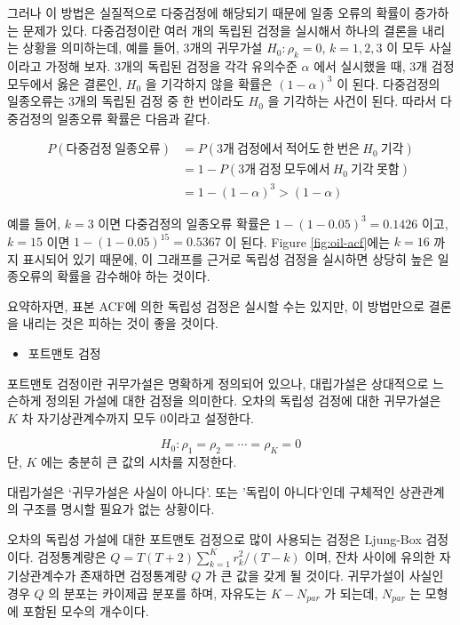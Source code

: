 \documentclass[
]{book}
\providecommand{\tightlist}{%
  \setlength{\itemsep}{0pt}\setlength{\parskip}{0pt}}
\begin{document}
그러나 이 방법은 실질적으로 다중검정에 해당되기 때문에 일종 오류의 확률이 증가하는 문제가 있다.
다중검정이란 여러 개의 독립된 검정을 실시해서 하나의 결론을 내리는 상황을 의미하는데,
예를 들어, 3개의 귀무가설 \(H_{0}: \rho_{k} = 0\), \(k=1, 2, 3\) 이 모두 사실이라고 가정해 보자.
3개의 독립된 검정을 각각 유의수준 \(\alpha\) 에서 실시했을 때,
3개 검정 모두에서 옳은 결론인, \(H_{0}\) 을 기각하지 않을 확률은 \((1-\alpha)^{3}\) 이 된다.
다중검정의 일종오류는 3개의 독립된 검정 중 한 번이라도 \(H_{0}\) 을 기각하는 사건이 된다.
따라서 다중검정의 일종오류 확률은 다음과 같다.

\begin{align*}
P(다중검정~일종오류) &= P(3개~검정에서~적어도~한~번은~H_{0}~기각) \\
                     &= 1-P(3개~검정~모두에서~H_{0}~기각~못함) \\
                     &= 1-(1-\alpha)^{3} > (1-\alpha) 
\end{align*}

예를 들어, \(k=3\) 이면 다중검정의 일종오류 확률은 \(1-(1-0.05)^{3} = 0.1426\) 이고,
\(k=15\) 이면 \(1-(1-0.05)^{15} = 0.5367\) 이 된다.
Figure \ref{fig:oil-acf}에는 \(k=16\) 까지 표시되어 있기 때문에,
이 그래프를 근거로 독립성 검정을 실시하면 상당히 높은 일종오류의 확률을 감수해야 하는 것이다.

요약하자면, 표본 ACF에 의한 독립성 검정은 실시할 수는 있지만,
이 방법만으로 결론을 내리는 것은 피하는 것이 좋을 것이다.

\begin{itemize}
\tightlist
\item
  포트맨토 검정
\end{itemize}

포트맨토 검정이란 귀무가설은 명확하게 정의되어 있으나,
대립가설은 상대적으로 느슨하게 정의된 가설에 대한 검정을 의미한다.
오차의 독립성 검정에 대한 귀무가설은 \(K\) 차 자기상관계수까지 모두 0이라고 설정한다.

\[
H_{0}: \rho_{1}=\rho_{2} = \cdots =\rho_{K}=0
\]
단, \(K\) 에는 충분히 큰 값의 시차를 지정한다.

대립가설은 `귀무가설은 사실이 아니다'.
또는 '독립이 아니다'인데 구체적인 상관관계의 구조를 명시할 필요가 없는 상황이다.

오차의 독립성 가설에 대한 포트맨토 검정으로 많이 사용되는 검정은 Ljung-Box 검정이다.
검정통계량은 \(Q=T(T+2)\sum_{k=1}^{K} r_{k}^{2} / (T-k)\) 이며,
잔차 사이에 유의한 자기상관계수가 존재하면 검정통계량 \(Q\) 가 큰 값을 갖게 될 것이다.
귀무가설이 사실인 경우 \(Q\) 의 분포는 카이제곱 분포를 하며,
자유도는 \(K - N_{par}\) 가 되는데, \(N_{par}\) 는 모형에 포함된 모수의 개수이다.
\end{document}
